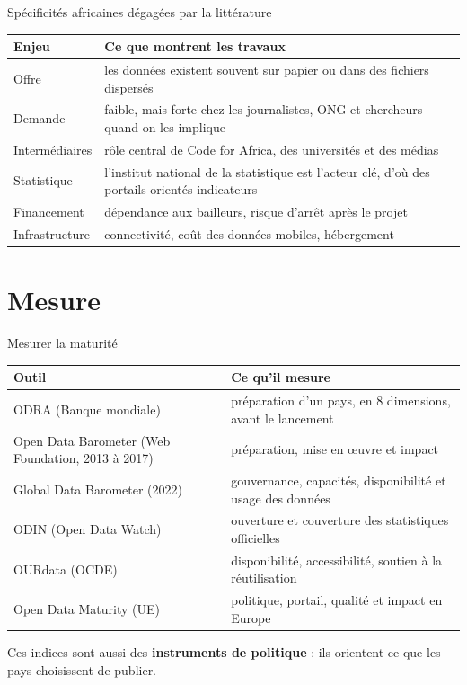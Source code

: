\documentclass[11pt,aspectratio=169]{beamer}
\begin{document}
\begin{frame}{Spécificités africaines dégagées par la littérature}
  \small
  \begin{tabularx}{\textwidth}{@{}lX@{}}
    \toprule
    \textbf{Enjeu} & \textbf{Ce que montrent les travaux} \\
    \midrule
    Offre & les données existent souvent sur papier ou dans des fichiers dispersés \\
    Demande & faible, mais forte chez les journalistes, ONG et chercheurs quand on les implique \\
    Intermédiaires & rôle central de Code for Africa, des universités et des médias \\
    Statistique & l'institut national de la statistique est l'acteur clé, d'où des portails orientés indicateurs \\
    Financement & dépendance aux bailleurs, risque d'arrêt après le projet \\
    Infrastructure & connectivité, coût des données mobiles, hébergement \\
    \bottomrule
  \end{tabularx}
\end{frame}

\section{Mesure}

\begin{frame}{Mesurer la maturité}
  \small
  \begin{tabularx}{\textwidth}{@{}lX@{}}
    \toprule
    \textbf{Outil} & \textbf{Ce qu'il mesure} \\
    \midrule
    ODRA (Banque mondiale) & préparation d'un pays, en 8 dimensions, avant le lancement \\
    Open Data Barometer (Web Foundation, 2013 à 2017) & préparation, mise en œuvre et impact \\
    Global Data Barometer (2022) & gouvernance, capacités, disponibilité et usage des données \\
    ODIN (Open Data Watch) & ouverture et couverture des statistiques officielles \\
    OURdata (OCDE) & disponibilité, accessibilité, soutien à la réutilisation \\
    Open Data Maturity (UE) & politique, portail, qualité et impact en Europe \\
    \bottomrule
  \end{tabularx}
  \vspace{0.6em}
  Ces indices sont aussi des \textbf{instruments de politique} : ils orientent ce que les pays choisissent de publier.
\end{frame}
\end{document}
